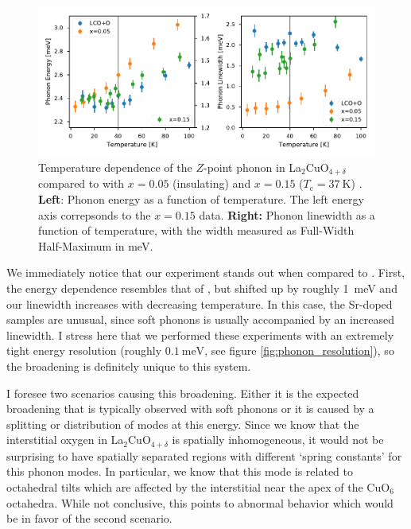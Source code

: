 \begin{figure}
    \centering
    \includegraphics[width=\textwidth]{fig/lowen/lcoo_phonon_energies.pdf}
    \caption[lco+o Z-point phonon E-T plot]{Temperature dependence of the $Z$-point phonon in La$_2$CuO$_{4+\delta}$ compared to \LSCO{} with $x=0.05$ (insulating) \cite{Wakimoto2004} and $x=0.15$ ($T_\text{c} = \SI{37}{\kelvin}$) \cite{Lee1996}. \textbf{Left}: Phonon energy as a function of temperature. The left energy axis correpsonds to the $x=0.15$ data. \textbf{Right:} Phonon linewidth as a function of temperature, with the width measured as Full-Width Half-Maximum in meV.}
    \label{fig:lcoo_zpoint_phonon_energies}
\end{figure}

We immediately notice that our experiment stands out when compared to \LSCO{}. First, the energy dependence resembles that of \LSCOopt{}, but shifted up by roughly \SI{1}{\milli\eV} and our linewidth increases with decreasing temperature. In this case, the Sr-doped samples are unusual, since soft phonons is usually accompanied by an increased linewidth. I stress here that we performed these experiments with an extremely tight energy resolution (roughly $\SI{0.1}{\milli\eV}$, see figure \ref{fig:phonon_resolution}), so the broadening is definitely unique to this system.

I foresee two scenarios causing this broadening. Either it is the expected broadening that is typically observed with soft phonons or it is caused by a splitting or distribution of modes at this energy. Since we know that the interstitial oxygen in La$_2$CuO$_{4+\delta}$ is spatially inhomogeneous, it would not be surprising to have spatially separated regions with different `spring constants' for this phonon modes. In particular, we know that this mode is related to octahedral tilts which are affected by the interstitial near the apex of the CuO$_6$ octahedra. While not conclusive, this points to abnormal behavior which would be in favor of the second scenario.

